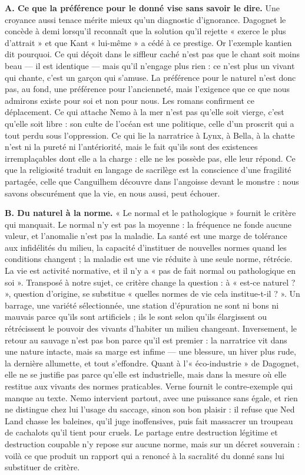 \documentclass[11pt,a4paper]{article}
\begin{document}
\textbf{A. Ce que la préférence pour le donné vise sans savoir le dire.} Une croyance aussi tenace mérite mieux qu'un diagnostic d'ignorance. Dagognet le concède à demi lorsqu'il reconnaît que la solution qu'il rejette « exerce le plus d'attrait » et que Kant « lui-même » a cédé à ce prestige. Or l'exemple kantien dit pourquoi. Ce qui déçoit dans le siffleur caché n'est pas que le chant soit moins beau --- il est identique --- mais qu'il n'engage plus rien : ce n'est plus un vivant qui chante, c'est un garçon qui s'amuse. La préférence pour le naturel n'est donc pas, au fond, une préférence pour l'ancienneté, mais l'exigence que ce que nous admirons existe pour soi et non pour nous. Les romans confirment ce déplacement. Ce qui attache Nemo à la mer n'est pas qu'elle soit vierge, c'est qu'elle soit libre : son culte de l'océan est une politique, celle d'un proscrit qui a tout perdu sous l'oppression. Ce qui lie la narratrice à Lynx, à Bella, à la chatte n'est ni la pureté ni l'antériorité, mais le fait qu'ils sont des existences irremplaçables dont elle a la charge : elle ne les possède pas, elle leur répond. Ce que la religiosité traduit en langage de sacrilège est la conscience d'une fragilité partagée, celle que Canguilhem découvre dans l'angoisse devant le monstre : nous savons obscurément que la vie, en nous aussi, peut échouer.

\textbf{B. Du naturel à la norme.} « Le normal et le pathologique » fournit le critère qui manquait. Le normal n'y est pas la moyenne : la fréquence ne fonde aucune valeur, et l'anomalie n'est pas la maladie. La santé est une marge de tolérance aux infidélités du milieu, la capacité d'instituer de nouvelles normes quand les conditions changent ; la maladie est une vie réduite à une seule norme, rétrécie. La vie est activité normative, et il n'y a « pas de fait normal ou pathologique en soi ». Transposé à notre sujet, ce critère change la question : à « est-ce naturel ? », question d'origine, se substitue « quelles normes de vie cela institue-t-il ? ». Un barrage, une variété sélectionnée, une station d'épuration ne sont ni bons ni mauvais parce qu'ils sont artificiels ; ils le sont selon qu'ils élargissent ou rétrécissent le pouvoir des vivants d'habiter un milieu changeant. Inversement, le retour au sauvage n'est pas bon parce qu'il est premier : la narratrice vit dans une nature intacte, mais sa marge est infime --- une blessure, un hiver plus rude, la dernière allumette, et tout s'effondre. Quant à l'« éco-industrie » de Dagognet, elle ne se justifie pas parce qu'elle est industrielle, mais dans la mesure où elle restitue aux vivants des normes praticables. Verne fournit le contre-exemple qui manque au texte. Nemo intervient partout, avec une puissance sans égale, et rien ne distingue chez lui l'usage du saccage, sinon son bon plaisir : il refuse que Ned Land chasse les baleines, qu'il juge inoffensives, puis fait massacrer un troupeau de cachalots qu'il tient pour cruels. Le partage entre destruction légitime et destruction coupable n'y repose sur aucune norme, mais sur un décret souverain : voilà ce que produit un rapport qui a renoncé à la sacralité du donné sans lui substituer de critère.
\end{document}
